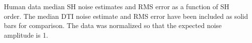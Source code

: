 \label{fig:humanGraph} Human data median SH noise estimates and RMS error as a function of SH order. The median DTI noise estimate and RMS error have been included as solid bars for comparison. The data was normalized so that the expected noise amplitude is 1.